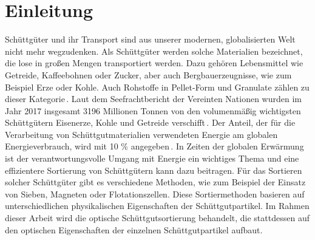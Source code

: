 \chapter{Einleitung}


Schüttgüter und ihr Transport sind aus unserer modernen, globalisierten Welt nicht mehr wegzudenken.
Als Schüttgüter werden solche Materialien bezeichnet, die lose in großen Mengen transportiert werden. 
Dazu gehören Lebensmittel wie Getreide, Kaffeebohnen oder Zucker, aber auch Bergbauerzeugnisse, wie zum Beispiel Erze oder Kohle. 
Auch Rohstoffe in Pellet-Form und Granulate zählen zu dieser Kategorie\,\cite[]{schulze2009}.
Laut dem Seefrachtbericht der Vereinten Nationen wurden im Jahr 2017 insgesamt 3196 Millionen Tonnen von den volumenmäßig wichtigsten Schüttgütern Eisenerze, Kohle und Getreide verschifft\,\cite[Unterabschnitt 1.A.2]{unitednationsconferenceontradeanddevelopment2018}.
Der Anteil, der für die Verarbeitung von Schüttgutmaterialien verwendeten Energie am globalen Energieverbrauch, wird mit 10 \% angegeben\,\cite[Abschnitt 1.2]{duran2012sands}.
In Zeiten der globalen Erwärmung ist der verantwortungsvolle Umgang mit Energie ein wichtiges Thema 
und eine effizientere Sortierung von Schüttgütern kann dazu beitragen.
Für das Sortieren solcher Schüttgüter gibt es verschiedene Methoden, 
wie zum Beispiel der Einsatz von Sieben, Magneten oder Flotationszellen.
Diese Sortiermethoden basieren auf unterschiedlichen physikalischen Eigenschaften der Schüttgutpartikel.
Im Rahmen dieser Arbeit wird die optische Schüttgutsortierung behandelt, 
die stattdessen auf den optischen Eigenschaften der einzelnen Schüttgutpartikel aufbaut.
